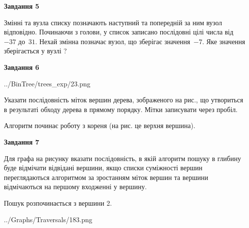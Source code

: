 \documentclass[12pt, ukrainian]{article}
\begin{document}
{\begin {large}
{\begin {center}\textbf{Завдання 5}\end {center}}\par
Змінні  та  вузла списку позначають наступний та попередній за ним вузол відповідно. Починаючи з голови, у список записано послідовні цілі числа від~$-37$ до~$31$. Нехай змінна  позначає вузол, що зберігає значення~$-7$.
Яке значення зберігається у вузлі  ?\par
\newpage

{\begin {center}\textbf{Завдання 6}\end {center}}\par

\begin{center}
	{../BinTree/trees_exp/23.png}
\end{center}
Указати послідовність міток вершин дерева, зображеного на рис., що утвориться в результаті обходу дерева в прямому порядку. Мітки записувати через пробіл.\par Алгоритм починає роботу з кореня (на рис. це верхня вершина).\par
\newpage

{\begin {center}\textbf{Завдання 7}\end {center}}\par
Для графа на рисунку вказати послідовність, в якій алгоритм пошуку в глибину буде відмічати відвідані вершини, якщо списки суміжності вершин переглядаються алгоритмом за зростанням міток вершин та вершини відмічаються на першому вход\-женні у вершину.\par
Пошук розпочинається з вершини 2.\par

\begin{center}
	{../Graphs/Traversals/183.png}
\end{center}\par
\newpage


\end{large}}
\end{document}
